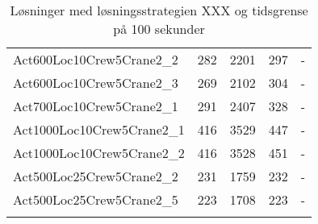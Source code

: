 \begin{center}
\begin{longtable}{ | l | c | c | c | c | }
Act600Loc10Crew5Crane2\_2	&	282	&	2201	&	297	&	-	\\	
Act600Loc10Crew5Crane2\_3	&	269	&	2102	&	304	&	-	\\	
Act700Loc10Crew5Crane2\_1	&	291	&	2407	&	328	&	-	\\	
Act1000Loc10Crew5Crane2\_1	&	416	&	3529	&	447	&	-	\\	
Act1000Loc10Crew5Crane2\_2	&	416	&	3528	&	451	&	-	\\	
Act500Loc25Crew5Crane2\_2	&	231	&	1759	&	232	&	-	\\	
Act500Loc25Crew5Crane2\_5	&	223	&	1708	&	223	&	-	\\	
\hline		
\caption{Løsninger med løsningsstrategien XXX og tidsgrense på 100 sekunder}										
\label{tab:solutionSSTFAARF100s}								
\end{longtable}				
\end{center}

